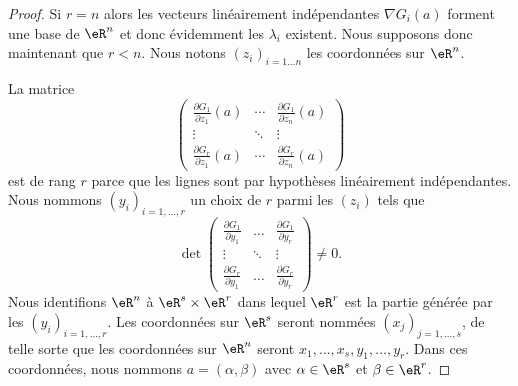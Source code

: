 \begin{proof}
	Si \( r=n\) alors les vecteurs linéairement indépendantes \( \nabla G_i(a) \) forment une base de \( \eR^n\) et donc évidemment les \( \lambda_i\) existent. Nous supposons donc maintenant que \( r<n\). Nous notons \( (z_i)_{i=1\ldots n}\) les coordonnées sur \( \eR^n\).

	La matrice
	\begin{equation}
		\begin{pmatrix}
			\frac{ \partial G_1 }{ \partial z_1 }(a) & \cdots & \frac{ \partial G_1 }{ \partial z_n }(a) \\
			\vdots                                   & \ddots & \vdots                                   \\
			\frac{ \partial G_r }{ \partial z_1 }(a) & \cdots & \frac{ \partial G_r }{ \partial z_n }(a)
		\end{pmatrix}
	\end{equation}
	est de rang \( r\) parce que les lignes sont par hypothèses linéairement indépendantes. Nous nommons \( (y_i)_{i=1,\ldots, r}\) un choix de \( r\) parmi les \( (z_i)\) tels que
	\begin{equation}
		\det\begin{pmatrix}
			\frac{ \partial G_1 }{ \partial y_1 } & \ldots & \frac{ \partial G_1 }{ \partial y_r } \\
			\vdots                                & \ddots & \vdots                                \\
			\frac{ \partial G_r }{ \partial y_1 } & \ldots & \frac{ \partial G_r }{ \partial y_r }
		\end{pmatrix}\neq 0.
	\end{equation}
	Nous identifions \( \eR^n\) à \( \eR^s\times \eR^r\) dans lequel \( \eR^r\) est la partie générée par les \( (y_i)_{i=1,\ldots, r}\). Les coordonnées sur \( \eR^s\) seront nommées \( (x_j)_{j=1,\ldots, s}\), de telle sorte que les coordonnées sur \( \eR^n\) seront \( x_1,\ldots, x_s,y_1,\ldots, y_r\). Dans ces coordonnées, nous nommons \( a=(\alpha,\beta)\) avec \( \alpha\in \eR^s\) et \( \beta\in \eR^r\).


\end{proof}

